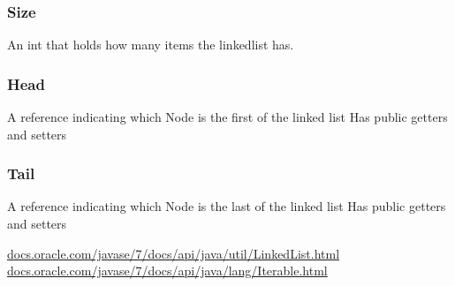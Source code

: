 \documentclass{article}
\begin{document}
\subsubsection{Size}
An int that holds how many items the linkedlist has.
\subsubsection{Head}
A reference indicating which Node is the first of the linked list
Has public getters and setters
\subsubsection{Tail}
A reference indicating which Node is the last of the linked list
Has public getters and setters


    



\begin{list}
    \url{docs.oracle.com/javase/7/docs/api/java/util/LinkedList.html}
    \url{docs.oracle.com/javase/7/docs/api/java/lang/Iterable.html}
\end{list}
\end{document}

